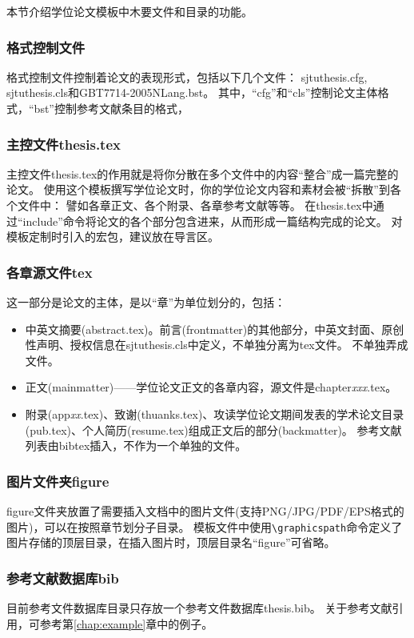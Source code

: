 本节介绍学位论文模板中木要文件和目录的功能。

\subsubsection{格式控制文件}
\label{sec:format}

格式控制文件控制着论文的表现形式，包括以下几个文件：
sjtuthesis.cfg, sjtuthesis.cls和GBT7714-2005NLang.bst。
其中，“cfg”和“cls”控制论文主体格式，“bst”控制参考文献条目的格式，

\subsubsection{主控文件thesis.tex}
\label{sec:thesistex}

主控文件thesis.tex的作用就是将你分散在多个文件中的内容“整合”成一篇完整的论文。
使用这个模板撰写学位论文时，你的学位论文内容和素材会被“拆散”到各个文件中：
譬如各章正文、各个附录、各章参考文献等等。
在thesis.tex中通过“include”命令将论文的各个部分包含进来，从而形成一篇结构完成的论文。
对模板定制时引入的宏包，建议放在导言区。

\subsubsection{各章源文件tex}
\label{sec:thesisbody}

这一部分是论文的主体，是以“章”为单位划分的，包括：

\begin{itemize}[noitemsep,topsep=0pt,parsep=0pt,partopsep=0pt]
	\item 中英文摘要(abstract.tex)。前言(frontmatter)的其他部分，中英文封面、原创性声明、授权信息在sjtuthesis.cls中定义，不单独分离为tex文件。
不单独弄成文件。
	\item 正文(mainmatter)——学位论文正文的各章内容，源文件是chapter\emph{xxx}.tex。
	\item 附录(app\emph{xx}.tex)、致谢(thuanks.tex)、攻读学位论文期间发表的学术论文目录(pub.tex)、个人简历(resume.tex)组成正文后的部分(backmatter)。
参考文献列表由bibtex插入，不作为一个单独的文件。
\end{itemize}

\subsubsection{图片文件夹figure}
\label{sec:fig}

figure文件夹放置了需要插入文档中的图片文件(支持PNG/JPG/PDF/EPS格式的图片)，可以在按照章节划分子目录。
模板文件中使用\verb|\graphicspath|命令定义了图片存储的顶层目录，在插入图片时，顶层目录名“figure”可省略。

\subsubsection{参考文献数据库bib}
\label{sec:bib}

目前参考文件数据库目录只存放一个参考文件数据库thesis.bib。
关于参考文献引用，可参考第\ref{chap:example}章中的例子。

